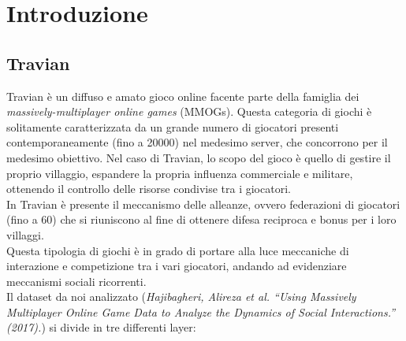 \chapter{Introduzione}
\section{Travian}
Travian è un diffuso e amato gioco online facente parte della famiglia dei \textit{massively-multiplayer online games} (MMOGs).
Questa categoria di giochi è solitamente caratterizzata da un grande numero di giocatori presenti contemporaneamente (fino a 20000) nel medesimo server, che concorrono per il medesimo obiettivo.
Nel caso di Travian, lo scopo del gioco è quello di gestire il proprio villaggio, espandere la propria influenza commerciale e militare, ottenendo il controllo delle risorse condivise tra i giocatori.\\
In Travian è presente il meccanismo delle alleanze, ovvero federazioni di giocatori (fino a 60) che si riuniscono al fine di ottenere difesa reciproca e bonus per i loro villaggi.\\
Questa tipologia di giochi è in grado di portare alla luce meccaniche di interazione e competizione tra i vari giocatori, andando ad evidenziare meccanismi sociali ricorrenti.\\

Il dataset da noi analizzato (\textit{Hajibagheri, Alireza et al. “Using Massively Multiplayer Online Game Data to Analyze the Dynamics of Social Interactions.” (2017).}) si divide in tre differenti layer:

